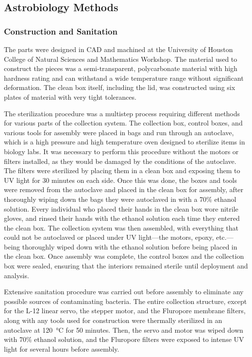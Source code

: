 \subsection{Astrobiology Methods}
\label{subsec:Astrobiology-Methods}

\subsubsection{Construction and Sanitation}
\label{subsubsec:Construction and Sanitation}
The parts were designed in CAD and machined at the University of Houston College of Natural Sciences and Mathematics Workshop. The material used to construct the pieces was a semi-transparent, polycarbonate material with high hardness rating and can withstand a wide temperature range without significant deformation. The clean box itself, including the lid, was constructed using six plates of material with very tight tolerances. 

The sterilization procedure was a multistep process requiring different methods for various parts of the
collection system. The collection box, control boxes, and various tools for assembly were placed in bags
and run through an autoclave, which is a high pressure and high temperature oven designed to sterilize items in
biology labs. It was necessary to perform this procedure without the motors or filters installed, as they
would be damaged by the conditions of the autoclave. The filters were sterilized by placing them in a
clean box and exposing them to UV light for 30 minutes on each side. Once this was done, the boxes and
tools were removed from the autoclave and placed in the clean box for assembly, after thoroughly wiping
down the bags they were autoclaved in with a 70\% ethanol solution. Every individual who placed their
hands in the clean box wore nitrile gloves, and rinsed their hands with the ethanol solution each time they
entered the clean box. The collection system was then assembled, with everything that could not be
autoclaved or placed under UV light—the motors, epoxy, etc.—being thoroughly wiped down with the
ethanol solution before being placed in the clean box. Once assembly was complete, the control boxes and
the collection box were sealed, ensuring that the interiors remained sterile until deployment and analysis.

Extensive sanitation procedure was carried out before assembly to eliminate any possible sources of contaminating bacteria. The entire collection structure, except for the L-12 linear servo, the stepper motor, and the Fluropore membrane filters, along with any tools used for construction were thermally sterilized in an autoclave at \SI{120}{\celsius} for 50 minutes. Then, the servo and motor was wiped down with 70\% ethanol solution, and the Fluropore filters were exposed to intense UV light for several hours before assembly.

